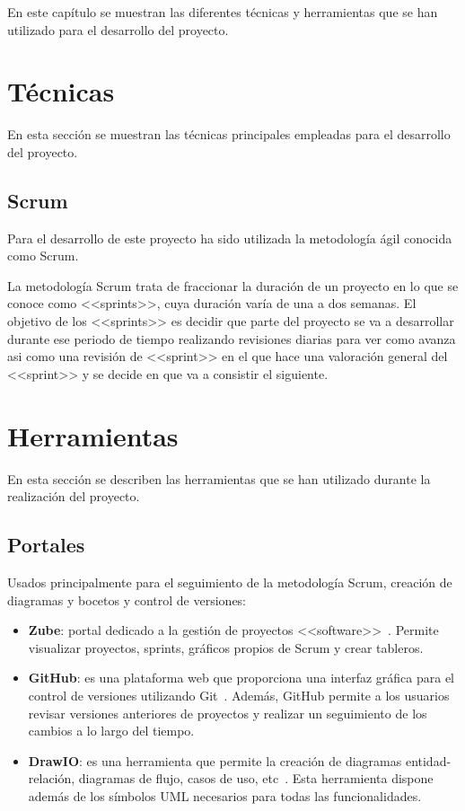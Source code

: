 
En este capítulo se muestran las diferentes técnicas y herramientas que se han utilizado para el desarrollo del proyecto.


\section{Técnicas}

En esta sección se muestran las técnicas principales empleadas para el desarrollo del proyecto.

\subsection{Scrum}

Para el desarrollo de este proyecto ha sido utilizada la metodología ágil conocida como Scrum.

La metodología Scrum trata de fraccionar la duración de un proyecto en lo que se conoce como <<sprints>>, cuya duración varía de una a dos semanas.
El objetivo de los <<sprints>> es decidir que parte del proyecto se va a desarrollar durante ese periodo de tiempo realizando revisiones diarias para ver como avanza asi como una revisión de <<sprint>> en el que hace una valoración general del <<sprint>> y se decide en que va a consistir el siguiente.

\section{Herramientas}

En esta sección se describen las herramientas que se han utilizado durante la realización del proyecto.

\subsection{Portales}

Usados principalmente para el seguimiento de la metodología Scrum, creación de diagramas y bocetos y control de versiones:
\begin{itemize}
\item \textbf{Zube}: portal dedicado a la gestión de proyectos <<software>>~\cite{zubeHome}. Permite visualizar proyectos, sprints,
gráficos propios de Scrum y crear tableros.
\item \textbf{GitHub}: es una plataforma web que proporciona una interfaz gráfica para el control de versiones utilizando Git~\cite{gitbubHome}. Además, GitHub permite a los usuarios revisar versiones anteriores de proyectos y realizar un seguimiento de los cambios a lo largo del tiempo.
\item \textbf{DrawIO}: es una herramienta que permite la creación de diagramas entidad-relación, diagramas de flujo, casos de uso, etc~\cite{drawioHome}. Esta herramienta dispone además de los símbolos UML necesarios para todas las funcionalidades.
\end{itemize}

